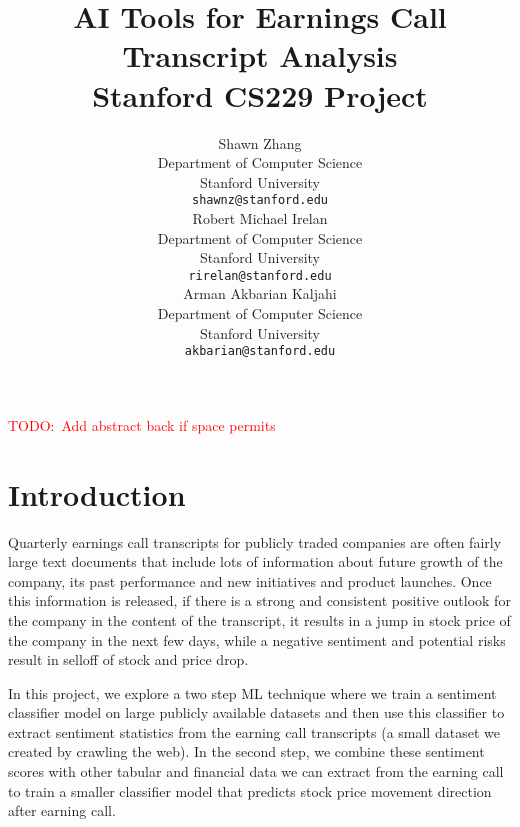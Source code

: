 \documentclass{article}
\title{
  AI Tools for Earnings Call Transcript Analysis \\
  \vspace{1em}
  \small{\normalfont Stanford CS229 Project}  %
}
\author{
  Shawn Zhang  \\
  Department of Computer Science \\
  Stanford University \\
  \texttt{shawnz@stanford.edu} \\
   \And
  Robert Michael Irelan \\
  Department of Computer Science \\
  Stanford University \\
  \texttt{rirelan@stanford.edu} \\
   \And
Arman Akbarian Kaljahi  \\
  Department of Computer Science \\
  Stanford University \\
  \texttt{akbarian@stanford.edu} \\
}
\newcommand{\TODO}[1]{\textcolor{red}{{TODO:~#1}}}
\newif\ifshowInstructions
\newcommand{\instructions}[1]{%
    \ifshowInstructions%
        \textcolor{violet}{#1}%
    \fi%
}
\begin{document}
\maketitle

\TODO{Add abstract back if space permits}



\section{Introduction\instructions{{} | 0.5 page}}
\instructions{%
Explain the problem and why it is important. Discuss your motivation for pursuing this problem. Give some background if necessary. Clearly state what the input and output is. Be very explicit: “The input to our algorithm is an {image, amplitude, patient age, rainfall measurements, grayscale video, etc.}. We then use a {SVM, neural network, linear regression, etc.} to output a predicted {age, stock price, cancer type, music genre, etc.}.” This is very important since different teams have different inputs/outputs spanning different application domains. Being explicit about this makes it easier for readers. If you are using your project for multiple classes, add a paragraph explaining which components of the project were used for each class.}

Quarterly earnings call transcripts for publicly traded companies are 
often fairly large text documents that include lots of information about 
future growth of the company, its past performance and new initiatives 
and product launches. Once this information is released, if there is 
a strong and consistent positive outlook for the company in the 
content of the transcript, it results in a jump in stock price 
of the company in the next few days, while a negative sentiment 
and potential risks result in selloff of stock and price drop. 

In this project, we explore a two step ML technique where we
train a sentiment classifier model on large publicly available datasets 
and then use this classifier to extract sentiment statistics from the earning
call transcripts (a small dataset we created by crawling the web). 
In the second step, we combine these sentiment scores with other tabular and financial 
data we can extract from the earning call to train a smaller
classifier model that predicts stock price movement direction after earning call. 
\end{document}

